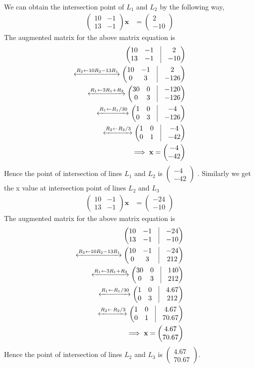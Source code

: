 \documentclass[16pt, a4paper, two column]{article}
\newcommand{\myvec}[1]{\ensuremath{\begin{pmatrix}#1\end{pmatrix}}}
\let\vec\mathbf
\begin{document}
We can obtain the intersection point of $L_1$ and $L_2$ by the following way,
\begin{align}
	\myvec{10 & -1 \\
		13 & -1}\vec{x} &= \myvec{2 \\ -10} 
\end{align}
The augmented matrix for the above matrix equation is 
\begin{align}
	\myvec{ 10 & -1 & \vrule & 2 \\
		13 & -1 & \vrule & -10} \\
	\xleftrightarrow[]{R_2 \leftarrow 10R_2-13R_1}
		\myvec{ 10 & -1 & \vrule & 2 \\
			0 & 3 & \vrule & -126} \\
	\xleftrightarrow[]{R_1 \leftarrow 3R_1+R_2}
		\myvec{ 30 & 0 & \vrule & -120 \\
			0 & 3 &\vrule & -126} \\
	\xleftrightarrow[]{R_1 \leftarrow R_1/30}
		\myvec{ 1 & 0 & \vrule & -4 \\
			0 & 3 & \vrule & -126} \\
	\xleftrightarrow[]{ R_2 \leftarrow R_2/3}
		\myvec{ 1 & 0 & \vrule & -4 \\
			0 & 1 & \vrule & -42} \\
	\implies \vec{x} = \myvec{-4 \\ -42}
\end{align}
Hence the point of intersection of lines $L_1$ and $L_2$ is $\myvec{-4 \\ -42}$ .\newline
Similarly we get the x value at intersection point of lines $L_2$ and $L_3$
\begin{align}
	\myvec{10 & -1 \\
		13 & -1}\vec{x} &= \myvec{-24 \\ -10}
\end{align}
The augmented matrix for the above matrix equation is 
\begin{align}
	\myvec{ 10 & -1 & \vrule & -24 \\
		13 & -1 & \vrule & -10} \\
	\xleftrightarrow[]{R_2 \leftarrow 10R_2-13R_1}
		\myvec{ 10 & -1 & \vrule & -24 \\
			0 & 3 & \vrule & 212} \\
	\xleftrightarrow[]{R_1 \leftarrow 3R_1+R_2}
		\myvec{ 30 & 0 & \vrule & 140 \\
			0 & 3 &\vrule & 212} \\
	\xleftrightarrow[]{R_1 \leftarrow R_1/30}
		\myvec{ 1 & 0 & \vrule &  4.67\\
			0 & 3 & \vrule & 212} \\
	\xleftrightarrow[]{R_2 \leftarrow R_2/3}
		\myvec{ 1 & 0 & \vrule &  4.67\\
			0 & 1 & \vrule & 70.67} \\
	\implies \vec{x} = \myvec{4.67 \\ 70.67}
\end{align}
Hence the point of intersection of lines $L_2$ and $L_3$ is $\myvec{4.67 \\ 70.67}$.\newline
\end{document}
